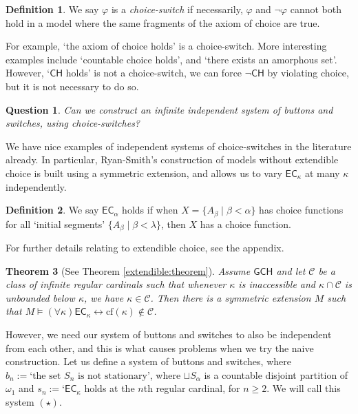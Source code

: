 \documentclass[a4paper,11pt]{amsart}
\newtheorem{theorem}{Theorem}[section]
\newtheorem{question}{Question}
\theoremstyle{definition}
\newtheorem{definition}[theorem]{Definition}
\newcommand{\CH}{\mathsf{CH}}
\newcommand{\GCH}{\mathsf{GCH}}
\newcommand{\EC}{\mathsf{EC}}
\begin{document}
\begin{definition}\label{choice-switch:def}
    We say $\varphi$ is a \emph{choice-switch} if necessarily, $\varphi$ and $\neg\varphi$ cannot both hold in a model where the same fragments of the axiom of choice are true. 
\end{definition}

For example, `the axiom of choice holds' is a choice-switch. More interesting examples include `countable choice holds', and `there exists an amorphous set'. However, `$\CH$ holds' is not a choice-switch, we can force $\neg\CH$ by violating choice, but it is not necessary to do so. 

\begin{question}
    Can we construct an infinite independent system of buttons and switches, using choice-switches? 
\end{question}

We have nice examples of independent systems of choice-switches in the literature already. In particular, Ryan-Smith's construction of models without extendible choice is built using a symmetric extension, and allows us to vary $\EC_\kappa$ at many $\kappa$ independently. 

\begin{definition}
    We say $\EC_\alpha$ holds if when $X = \{A_\beta \mid \beta < \alpha \}$ has choice functions for all `initial segments' $\{A_\beta \mid \beta < \lambda \}$, then $X$ has a choice function.
\end{definition}

For further details relating to extendible choice, see the appendix. 

\begin{theorem}[See Theorem \ref{extendible:theorem}]
     Assume $\GCH$ and let $\mathcal{C}$ be a class of infinite regular cardinals such that whenever $\kappa$ is inaccessible and $\kappa \cap \mathcal{C}$ is unbounded below $\kappa$, we have $\kappa \in \mathcal{C}$. Then there is a symmetric extension $M$ such that $M \models (\forall \kappa) \EC_\kappa \leftrightarrow \text{cf}(\kappa) \notin \mathcal{C}$.
 \end{theorem}

However, we need our system of buttons and switches to also be independent from each other, and this is what causes problems when we try the naive construction. Let us define a system of buttons and switches, where $b_n := \text{`the set }S_n\text{ is not stationary'}$, where $\sqcup S_\alpha$ is a countable disjoint partition of $\omega_1$ and $s_n := \text{`}\EC_\kappa$ holds at the $n$th regular cardinal, for $n \geqslant 2$. We will call this system $(\star)$. 
\end{document}
